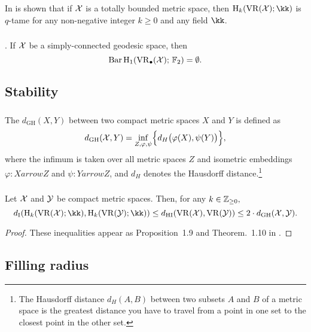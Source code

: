 In \cite[Prop.~5.1]{chazal2014geometric} is shown that if $\cX$ is a totally bounded metric space, then $\rH_k(\VR(\cX); \kk)$ is $q$-tame for any non-negative integer $k \geq 0$ and any field $\kk$.

\subsubsection{} \label{prop:pH1}{\rm \cite[Prop.~7.10]{virk20201}}.
If $\cX$ be a simply-connected geodesic space, then
\[
\Hbarc{1}{\cX} = \emptyset.
\]

\subsection{Stability}

\subsubsection{} The  $d_{\mathrm{GH}}(X, Y)$ between two compact metric spaces $X$ and $Y$ is defined as
\[
d_{\mathrm{GH}}(\cX, Y) = \inf_{Z, \varphi, \psi} \set[\Big]{d_H\big(\varphi(X), \psi(Y)\big)},
\]
where the infimum is taken over all metric spaces $Z$ and isometric embeddings $\varphi \colon X arrow Z$ and $\psi \colon Y arrow Z$, and $d_H$ denotes the Hausdorff distance.\footnote{
The Hausdorff distance $d_H(A, B)$ between two subsets $A$ and $B$ of a metric space is the greatest distance you have to travel from a point in one set to the closest point in the other set.
}

\subsubsection{}\label{thm:stability-HI}

\medskip\theorem Let $\cX$ and $\cY$ be compact metric spaces.
Then, for any $k \in \Z_{\geq 0},$
\[
\di(\rH_k(\VR(\cX); \kk), \rH_k(\VR(\cY); \kk)) \leq
\dhi(\VR(\cX), \VR(\cY)) \leq
2 \cdot d_{\mathrm{GH}}(\cX, \cY).
\]

\begin{proof}
	These inequalities appear as Proposition~1.9 and Theorem.~1.10 in \cite{blumberg2023interleaving}.
\end{proof}

\subsection{Filling radius}\label{ss:filling_radius}

